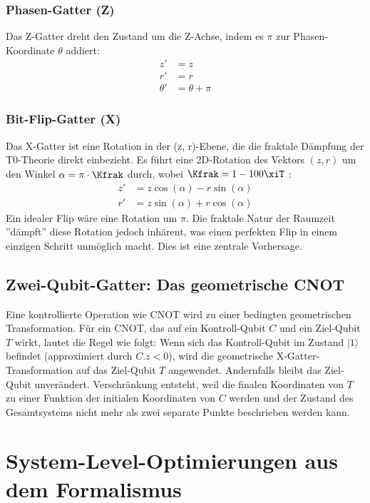 	
	\subsubsection{Phasen-Gatter (Z)}
	Das Z-Gatter dreht den Zustand um die Z-Achse, indem es $\pi$ zur Phasen-Koordinate $\theta$ addiert:
	\begin{align*}
		z' &= z \\
		r' &= r \\
		\theta' &= \theta + \pi
	\end{align*}
	
	\subsubsection{Bit-Flip-Gatter (X)}
	Das X-Gatter ist eine Rotation in der (z, r)-Ebene, die die fraktale Dämpfung der T0-Theorie direkt einbezieht. Es führt eine 2D-Rotation des Vektors $(z, r)$ um den Winkel $\alpha = \pi \cdot \Kfrak$ durch, wobei $\Kfrak = 1 - 100\xiT$ \cite{pascher:fundamentals}:
	\begin{align}
		z' &= z \cos(\alpha) - r \sin(\alpha) \\
		r' &= z \sin(\alpha) + r \cos(\alpha)
	\end{align}
	Ein idealer Flip wäre eine Rotation um $\pi$. Die fraktale Natur der Raumzeit ''dämpft'' diese Rotation jedoch inhärent, was einen perfekten Flip in einem einzigen Schritt unmöglich macht. Dies ist eine zentrale Vorhersage.
	
	\subsection{Zwei-Qubit-Gatter: Das geometrische CNOT}
	Eine kontrollierte Operation wie CNOT wird zu einer bedingten geometrischen Transformation. Für ein CNOT, das auf ein Kontroll-Qubit $C$ und ein Ziel-Qubit $T$ wirkt, lautet die Regel wie folgt: Wenn sich das Kontroll-Qubit im Zustand $|1\rangle$ befindet (approximiert durch $C.z < 0$), wird die geometrische X-Gatter-Transformation auf das Ziel-Qubit $T$ angewendet. Andernfalls bleibt das Ziel-Qubit unverändert. Verschränkung entsteht, weil die finalen Koordinaten von $T$ zu einer Funktion der initialen Koordinaten von $C$ werden und der Zustand des Gesamtsystems nicht mehr als zwei separate Punkte beschrieben werden kann.
	
	\section{System-Level-Optimierungen aus dem Formalismus}
	
